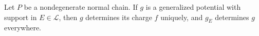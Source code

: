 Let $P$ be a nondegenerate normal chain. If $g$ is a generalized potential with support in $E \in \mathcal{L}$, then $g$ determines its charge $f$ uniquely, and $g_E$ determines $g$ everywhere.

